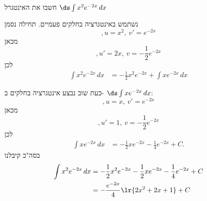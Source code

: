 חשבו את האינטגרל
$\ds \int x^{2}e^{-2x}\,dx$
\begin{solbox}
נשתמש באינטגרציה בחלקים פעמיים.
תחילה נסמן
$$,u=x^2,\ v'=e^{-2x}$$
מכאן
$$,u'=2x,\ v=-\frac{1}{2}e^{-2x}$$
לכן
\begin{align*}
\int x^2 e^{-2x}\,dx
&=-\frac12 x^2 e^{-2x}+\int x e^{-2x}\,dx
\end{align*}

כעת שוב נבצע אינטגרציה בחלקים ב-  $\ds \int x e^{-2x}\,dx$:
$$,u=x,\ v'=e^{-2x}$$
מכאן
$$,u'=1,\ v=-\frac{1}{2}e^{-2x}$$
לכן
\begin{align*}
\int x e^{-2x}\,dx
&=-\frac12 x e^{-2x}-\frac14 e^{-2x}+C.
\end{align*}
בסה"כ קיבלנו
\begin{align*}
\int x^2 e^{-2x}\,dx
&=-\frac12 x^2 e^{-2x}-\frac12 x e^{-2x}-\frac14 e^{-2x}+C\\
&=-\frac{e^{-2x}}{4}\lr{2x^2+2x+1}+C
\end{align*}
\end{solbox}
